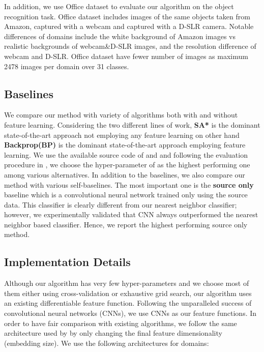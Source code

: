 In addition, we use Office\cite{office} dataset to evaluate our algorithm on the object recognition task. Office dataset includes images of the same objects taken from Amazon, captured with a webcam and captured with a D-SLR camera. Notable differences of domains include the white background of Amazon images vs realistic backgrounds of webcam\&D-SLR images, and the resolution difference of webcam and D-SLR. Office dataset have fewer number of images as maximum 2478 images per domain over 31 classes. %


\vspace{-2mm}
\subsection{Baselines}
We compare our method with variety of algorithms both with and without feature learning. Considering the two different lines of work, \textbf{SA*}\cite{fernando13} is the dominant state-of-the-art approach not employing any feature learning on other hand \textbf{Backprop(BP)}\cite{ganin15} is the dominant state-of-the-art approach employing feature learning. We use the available source code of \cite{ganin15} and \cite{fernando13} and following the evaluation procedure in \cite{ganin15}, we choose the hyper-parameter of \cite{fernando13} as the highest performing one among various alternatives. In addition to the baselines, we also compare our method with various self-baselines. The most important one is the \textbf{source only} baseline which is a convolutional neural network trained only using the source data. This classifier is clearly different from our nearest neighbor classifier; however, we experimentally validated that CNN always outperformed the nearest neighbor based classifier. Hence, we report the highest performing source only method.

\vspace{-2mm}
\subsection{Implementation Details}
\label{imp_det}
Although our algorithm has very few hyper-parameters and we choose most of them either using cross-validation or exhaustive grid search, our algorithm uses an existing differentiable feature function. Following the unparalleled success of convolutional neural networks (CNNs), we use CNNs as our feature functions.  In order to have  fair comparison with existing algorithms, we follow the same architecture used by \cite{ganin15} by only changing the final feature dimensionality (embedding size). We use the following architectures for domains:

